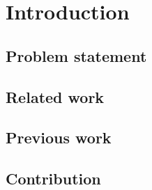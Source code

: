 \section{Introduction}

\subsection{Problem statement}

\subsection{Related work}

\subsection{Previous work}

\subsection{Contribution}